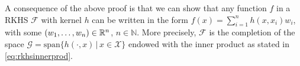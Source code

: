 
A consequence of the above proof is that we can show that any function $f$ in a RKHS $\mathcal F$ with kernel $h$ can be written in the form $f(x) = \sum_{i=1}^n h(x, x_i)w_i$, with some $(w_1,\dots,w_n)\in\mathbb{R}^n$, $n \in \mathbb N$. 
More precisely, $\mathcal F$ is the completion of the space $\mathcal G = \text{span}\{h(\cdot,x) \, | \, x \in \mathcal X \}$ endowed with the inner product as stated in \cref{eq:rkhsinnerprod}.



